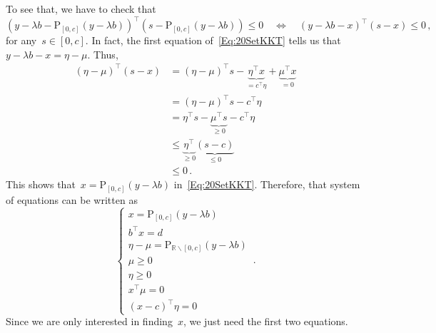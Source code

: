 \documentclass[letter,10pt]{article}
\theoremstyle{definition}
\theoremstyle{nonumberplain}
\begin{document}
		To see that, we have to check that
		$$
			(y - \lambda b - \text{P}_{[0,c]}(y - \lambda b))^\top (s - \text{P}_{[0,c]}(y - \lambda b)) \leq 0
			\quad
			\Longleftrightarrow
			\quad
			(y - \lambda b - x)^\top (s - x) \leq 0
			\,,
		$$
		for any~$s \in [0,c]$. In fact, the first equation of~\eqref{Eq:20SetKKT} tells us that $y - \lambda b - x = \eta - \mu$. Thus,
		\begin{align*}
			  (\eta-\mu)^\top (s - x)
			&=
			  (\eta-\mu)^\top s - \underbrace{\eta^\top x}_{=c^\top \eta} + \underbrace{\mu^\top x}_{=0}
			\\
			&=
			  (\eta-\mu)^\top s - c^\top \eta
			\\
			&=
			  \eta^\top s - \underbrace{\mu^\top s}_{\geq 0} - c^\top \eta
			\\
			&\leq
				\underbrace{\eta^\top}_{\geq 0} \underbrace{(s-c)}_{\leq 0}
			\\
			&\leq 0\,.
		\end{align*}
		This shows that~$x = \text{P}_{[0,c]}(y - \lambda b)$ in~\eqref{Eq:20SetKKT}. Therefore, that system of equations can be written as
		$$
			\left\{
			\begin{array}{l}
				x = \text{P}_{[0,c]}(y - \lambda b) \\
				b^\top x = d \\
				\eta - \mu = \text{P}_{\mathbb{R}\backslash[0,c]}(y - \lambda b)
				\\
				\mu \geq 0 \\
				\eta \geq 0 \\
				x^\top \mu = 0 \\
				(x-c)^\top \eta = 0
			\end{array}
			\right.
			\,.
		$$
	  Since we are only interested in finding~$x$, we just need the first two equations.
\end{document}
